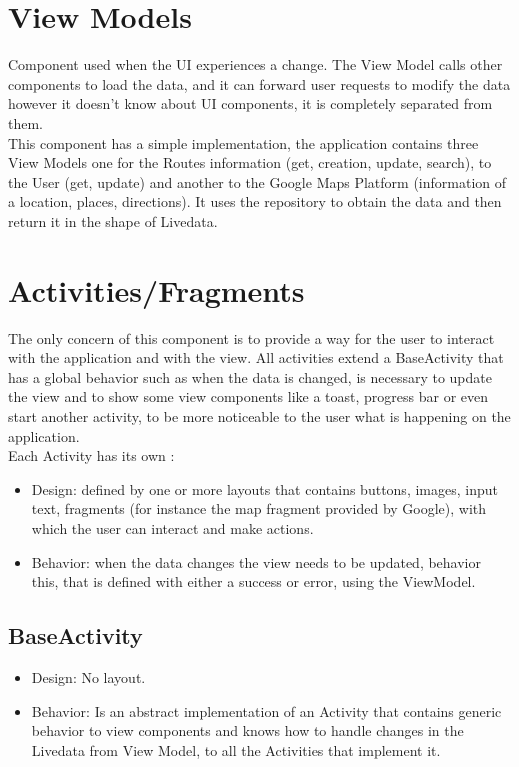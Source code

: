 \section{View Models}
Component used when the UI experiences a change. The View Model calls
other components to load the data, and it can forward user requests to
modify the data however it doesn't know about UI components, 
it is completely separated from them. \\
This component has a simple implementation, the application contains three View Models one for the Routes information (get, creation, update, search), 
to the User (get, update) and another to the Google Maps Platform (information of a location, places, directions). It uses the repository to obtain the data and 
then return it in the shape of Livedata.

\section{Activities/Fragments}
The only concern of this component is to provide a way for the user to interact with the application and with the view.
All activities extend a BaseActivity that has a global behavior such as when the data is changed, is necessary to update the view and to show some view components 
like a toast\cite{toasts}, progress bar\cite{progressBar} or even start another activity, to be more noticeable to the user what is happening on the application.\\

Each Activity has its own :
\begin{itemize}
        \item Design: defined by one or more layouts that contains buttons, images, input text, fragments (for instance the map fragment provided by Google), 
        with which the user can interact and make actions.
        \item Behavior: when the data changes the view needs to be updated, behavior this, that is defined with either a success or error, using the ViewModel.
\end{itemize}

\subsection{BaseActivity}
\begin{itemize}
        \item Design: No layout.
        \item Behavior: Is an abstract implementation of an Activity that contains generic behavior to view components and knows how to handle changes in the Livedata from View Model, 
        to all the Activities that implement it.
\end{itemize}

